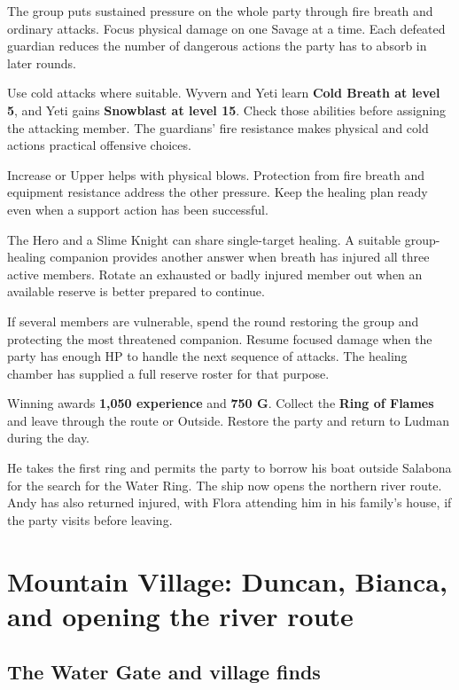The group puts sustained pressure on the whole party through fire
breath and ordinary attacks. Focus physical damage on one Savage at
a time. Each defeated guardian reduces the number of dangerous actions
the party has to absorb in later rounds.

Use cold attacks where suitable. Wyvern and Yeti learn
\textbf{Cold Breath at level 5}, and Yeti gains
\textbf{Snowblast at level 15}. Check those abilities before assigning
the attacking member. The guardians' fire
resistance makes physical and cold actions practical offensive choices.

Increase or Upper helps with physical blows. Protection from fire
breath and equipment resistance address the other pressure. Keep the
healing plan ready even when a support action has been successful.

The Hero and a Slime Knight can share single-target healing. A suitable
group-healing companion provides another answer when breath has injured
all three active members. Rotate an exhausted or badly injured member
out when an available reserve is better prepared to continue.

If several members are vulnerable, spend the round restoring the group
and protecting the most threatened companion. Resume focused damage
when the party has enough HP to handle the next sequence of attacks.
The healing chamber has supplied a full reserve roster for that purpose.

Winning awards \textbf{1,050 experience} and \textbf{750 G}.
Collect the \textbf{Ring of Flames} and leave through the route or
Outside. Restore the party and return to Ludman during the day.


He takes the first ring and permits the party to borrow his boat
outside Salabona for the search for the Water Ring. The ship now opens
the northern river route. Andy has also returned injured, with Flora
attending him in his family's house, if the party visits before leaving.

\section{Mountain Village: Duncan, Bianca, and opening the river route}

\subsection*{The Water Gate and village finds}

